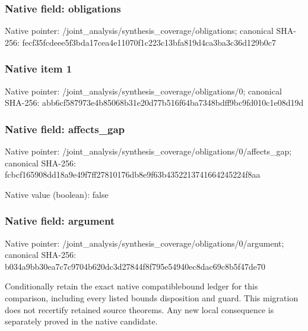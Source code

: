 \documentclass[10pt,a4paper]{article}
\begin{document}
\subsubsection{Native field: obligations}


Native pointer: /joint\_analysis/synthesi\allowbreak{}s\_coverage/obligations; canonical SHA-256: fecf35fcdeee5f3bda17cea4\allowbreak{}e11070f1c223c13bfa819d4c\allowbreak{}a3ba3c36d129b0c7



\subsubsection{Native item 1}


Native pointer: /joint\_analysis/synthesi\allowbreak{}s\_coverage/obligations/0; canonical SHA-256: abb6cf587973e4b85068b31e\allowbreak{}20d77b516f64ba7348bdff9b\allowbreak{}c9fd010c1e08d19d



\subsubsection{Native field: affects\_gap}


Native pointer: /joint\_analysis/synthesi\allowbreak{}s\_coverage/obligations/0\allowbreak{}/affects\_gap; canonical SHA-256: fcbcf165908dd18a9e49f7ff\allowbreak{}27810176db8e9f63b4352213\allowbreak{}741664245224f8aa



Native value (boolean): false



\subsubsection{Native field: argument}


Native pointer: /joint\_analysis/synthesi\allowbreak{}s\_coverage/obligations/0\allowbreak{}/argument; canonical SHA-256: b034a9bb30ea7c7c9704b620\allowbreak{}dc3d27844f8f795e54940ec8\allowbreak{}dac69c8b5f47de70


Conditionally retain the exact native compatiblebound ledger for this comparison, including every listed bounds disposition and guard. This migration does not recertify retained source theorems. Any new local consequence is separately proved in the native candidate.
\end{document}
